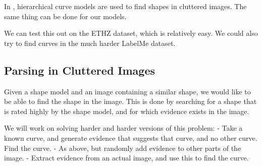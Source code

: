 
In \cite{hcm}, hierarchical curve models are used to find shapes in
cluttered images. The same thing can be done for our models.

We can test this out on the ETHZ dataset, which is relatively easy. We
could also try to find curves in the much harder LabelMe dataset.

\subsection{Parsing in Cluttered Images}
Given a shape model and an image containing a similar shape, we would
like to be able to find the shape in the image. This is done by
searching for a shape that is rated highly by the shape model, and for
which evidence exists in the image.

We will work on solving harder and harder versions of this problem:
  - Take a known curve, and generate evidence that suggests that
    curve, and no other curve. Find the curve.
  - As above, but randomly add evidence to other parts of the image.
  - Extract evidence from an actual image, and use this to find the
    curve.

